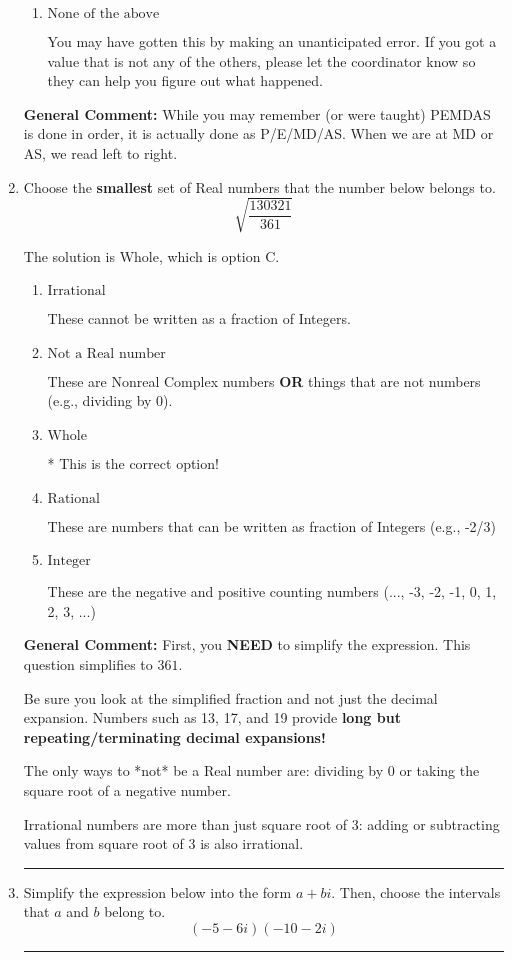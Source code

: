 \documentclass{extbook}[14pt]
\newcommand{\litem}[1]{\item #1

\rule{\textwidth}{0.4pt}}
\begin{document}
\begin{enumerate}
{\begin{enumerate}[label=\Alph*.]
 234.012, which corresponds to two Order of Operations errors.
\item \( \text{None of the above} \)

 You may have gotten this by making an unanticipated error. If you got a value that is not any of the others, please let the coordinator know so they can help you figure out what happened.
\end{enumerate}

\textbf{General Comment:} While you may remember (or were taught) PEMDAS is done in order, it is actually done as P/E/MD/AS. When we are at MD or AS, we read left to right.
}
\litem{
Choose the \textbf{smallest} set of Real numbers that the number below belongs to.
\[ \sqrt{\frac{130321}{361}} \]

The solution is \( \text{Whole} \), which is option C.\begin{enumerate}[label=\Alph*.]
\item \( \text{Irrational} \)

These cannot be written as a fraction of Integers.
\item \( \text{Not a Real number} \)

These are Nonreal Complex numbers \textbf{OR} things that are not numbers (e.g., dividing by 0).
\item \( \text{Whole} \)

* This is the correct option!
\item \( \text{Rational} \)

These are numbers that can be written as fraction of Integers (e.g., -2/3)
\item \( \text{Integer} \)

These are the negative and positive counting numbers (..., -3, -2, -1, 0, 1, 2, 3, ...)
\end{enumerate}

\textbf{General Comment:} First, you \textbf{NEED} to simplify the expression. This question simplifies to $361$. 
 
 Be sure you look at the simplified fraction and not just the decimal expansion. Numbers such as 13, 17, and 19 provide \textbf{long but repeating/terminating decimal expansions!} 
 
 The only ways to *not* be a Real number are: dividing by 0 or taking the square root of a negative number. 
 
 Irrational numbers are more than just square root of 3: adding or subtracting values from square root of 3 is also irrational.
}
\litem{
Simplify the expression below into the form $a+bi$. Then, choose the intervals that $a$ and $b$ belong to.
\[ (-5 - 6 i)(-10 - 2 i) \]

}
\end{enumerate}
\end{document}
